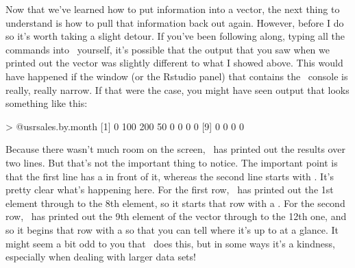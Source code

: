 Now that we've learned how to put information into a vector, the next  thing to understand is how to pull that information back out again. However, before I do so it's worth taking a slight detour. If you've been following along, typing all the commands into \R\ yourself, it's possible that the output that you saw when we printed out the  vector was slightly different to what I showed above. This would have happened if the window (or the Rstudio panel) that contains the \R\ console is really, really narrow. If that were the case, you might have seen output that looks something like this:
\begin{rblock1}
> @usr{sales.by.month}
 [1]   0 100 200  50   0   0   0   0
 [9]   0   0   0   0
\end{rblock1}
Because there wasn't much room on the screen, \R\ has printed out the results over two lines. But that's not the important thing to notice. The important point is that the first line has a \rtextoutput{[1]} in front of it, whereas the second line starts with \rtextoutput{[9]}. It's pretty clear what's happening here. For the first row, \R\ has printed out the 1st element through to the 8th element, so it starts that row with a \rtextoutput{[1]}. For the second row, \R\ has printed out the 9th element of the vector through to the 12th one, and so it begins that row with a \rtextoutput{[9]} so that you can tell where it's up to at a glance. It might seem a bit odd to you that \R\ does this, but in some ways it's a kindness, especially when dealing with larger data sets!



